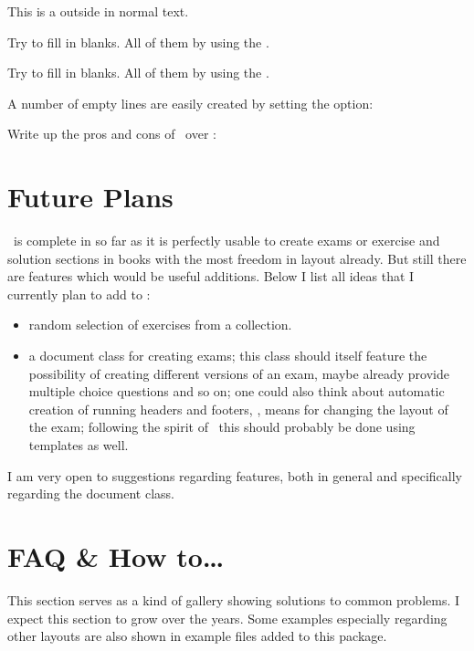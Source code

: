 \documentclass{xsim-manual}
\begin{document}
\begin{example}
  This is a  outside in normal text.
  \begin{exercise}
    Try to fill in  blanks.  All of them
     by using the  .
  \end{exercise}
  \begin{solution}[print]
    Try to fill in  blanks.  All of them
     by using the  .
  \end{solution}
\end{example}
A number of empty lines are easily created by setting the 
option:
\begin{example}
  Write up the pros and cons of \xsim\ over :
  
  \blank[width=4.8\linewidth,linespread=1.5]{}
\end{example}

\edef\lastsection{\arabic{section}}

\appendix

\section{Future Plans}

\xsim\ is complete in so far as it is perfectly usable to create exams or
exercise and solution sections in books with the most freedom in layout
already.  But still there are features which would be useful additions.  Below
I list all ideas that I currently plan to add to \xsim:
\begin{itemize}
  \item random selection of exercises from a collection.
  \item a document class  for creating exams; this class
    should itself feature the possibility of creating different versions of an
    exam, maybe already provide multiple choice questions and so on; one could
    also think about automatic creation of running headers and footers, \ie,
    means for changing the layout of the exam; following the spirit of \xsim\
    this should probably be done using templates as well.
\end{itemize}
I am very open to suggestions regarding features, both in general and
specifically regarding the document class.

\section{FAQ \& How to\dots}
This section serves as a kind of gallery showing solutions to common
problems.  I expect this section to grow over the years.  Some examples
especially regarding other layouts are also shown in example files added to
this package.
\end{document}
